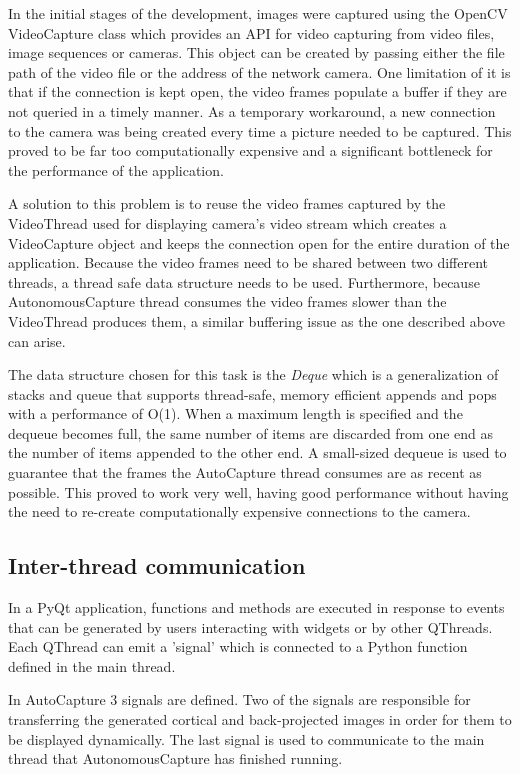 \documentclass{l4proj}
\begin{document}
In the initial stages of the development, images were captured using the OpenCV VideoCapture class which provides an API for video capturing from video files, image sequences or cameras. This object can be created by passing either the file path of the video file or the address of the network camera. One limitation of it is that if the connection is kept open, the video frames populate a buffer if they are not queried in a timely manner. As a temporary workaround, a new connection to the camera was being created every time a picture needed to be captured. This proved to be far too computationally expensive and a significant bottleneck for the performance of the application. 

A solution to this problem is to reuse the video frames captured by the VideoThread used for displaying camera's video stream which creates a VideoCapture object and keeps the connection open for the entire duration of the application. Because the video frames need to be shared between two different threads, a thread safe data structure needs to be used. Furthermore, because AutonomousCapture thread consumes the video frames slower than the VideoThread produces them, a similar buffering issue as the one described above can arise. 

The data structure chosen for this task is the \textit{Deque} which is a generalization of stacks and queue that supports thread-safe, memory efficient appends and pops with a performance of O(1). When a maximum length is specified and the dequeue becomes full, the same number of items are discarded from one end as the number of items appended to the other end. A small-sized dequeue is used to guarantee that the frames the AutoCapture thread consumes are as recent as possible. This proved to work very well, having good performance without having the need to re-create computationally expensive connections to the camera. 

\subsection{Inter-thread communication}

In a PyQt application, functions and methods are executed in response to events that can be generated by users interacting with widgets or by other QThreads. Each QThread can emit a 'signal' which is connected to a Python function defined in the main thread. 

In AutoCapture 3 signals are defined. Two of the signals are responsible for transferring the generated cortical and back-projected images in order for them to be displayed dynamically. The last signal is used to communicate to the main thread that AutonomousCapture has finished running.
\end{document}
